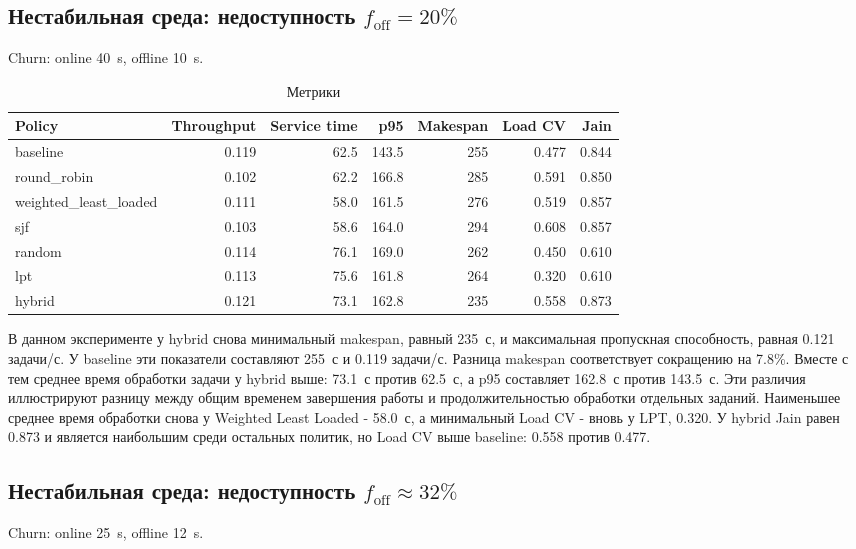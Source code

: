 \documentclass[a4paper,12pt]{extarticle}
\begin{document}
\subsection{Нестабильная среда: недоступность $f_{\text{off}}=20\%$}
Churn: online 40~s, offline 10~s.

\begin{table}[H]
\centering
    \caption{Метрики}
\footnotesize
\begin{tabular}{lrrrrrr}
\toprule
Policy & Throughput & Service time & p95 & Makespan & Load CV & Jain \\
\midrule
    baseline & 0.119 & 62.5 & 143.5 & 255 & 0.477 & 0.844 \\
    round\_robin & 0.102 & 62.2 & 166.8 & 285 & 0.591 & 0.850 \\
    weighted\_least\_loaded & 0.111 & 58.0 & 161.5 & 276 & 0.519 & 0.857 \\
    sjf & 0.103 & 58.6 & 164.0 & 294 & 0.608 & 0.857 \\
    random & 0.114 & 76.1 & 169.0 & 262 & 0.450 & 0.610 \\
    lpt & 0.113 & 75.6 & 161.8 & 264 & 0.320 & 0.610 \\
    hybrid & 0.121 & 73.1 & 162.8 & 235 & 0.558 & 0.873 \\
\bottomrule
\end{tabular}
\end{table}

В данном эксперименте у hybrid снова минимальный makespan, равный 235~с, и максимальная пропускная способность, равная 0.121 задачи/с. У baseline эти показатели составляют 255~с и 0.119 задачи/с. Разница makespan соответствует сокращению на 7.8\%. Вместе с тем среднее время обработки задачи у hybrid выше: 73.1~с против 62.5~с, а p95 составляет 162.8~с против 143.5~с. Эти различия иллюстрируют разницу между общим временем завершения работы и продолжительностью обработки отдельных заданий. Наименьшее среднее время обработки снова у Weighted Least Loaded - 58.0~с, а минимальный Load CV - вновь у LPT, 0.320. У hybrid Jain равен 0.873 и является наибольшим среди остальных политик, но Load CV выше baseline: 0.558 против 0.477.

\subsection{Нестабильная среда: недоступность $f_{\text{off}}\approx 32\%$}
Churn: online 25~s, offline 12~s.
\end{document}

